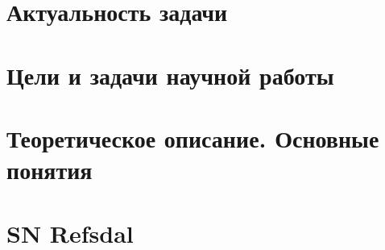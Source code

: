 % 
    
    \section{Актуальность задачи}
        
    
    \section{Цели и задачи научной работы}
        
    
    \section{Теоретическое описание. Основные понятия}
   
        
   
    \section{SN Refsdal}
        
   
   